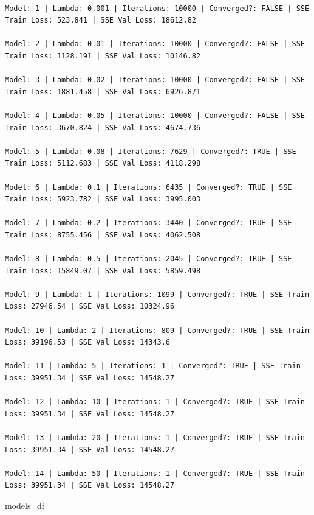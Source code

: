 \documentclass[
  letterpaper,
  DIV=11,
  numbers=noendperiod]{scrartcl}
\newenvironment{Shaded}{\begin{snugshade}}{\end{snugshade}}
\newcommand{\NormalTok}[1]{\textcolor[rgb]{0.00,0.23,0.31}{#1}}
\begin{document}
\begin{verbatim}

Model: 1 | Lambda: 0.001 | Iterations: 10000 | Converged?: FALSE | SSE Train Loss: 523.841 | SSE Val Loss: 18612.82 

Model: 2 | Lambda: 0.01 | Iterations: 10000 | Converged?: FALSE | SSE Train Loss: 1128.191 | SSE Val Loss: 10146.82 

Model: 3 | Lambda: 0.02 | Iterations: 10000 | Converged?: FALSE | SSE Train Loss: 1881.458 | SSE Val Loss: 6926.871 

Model: 4 | Lambda: 0.05 | Iterations: 10000 | Converged?: FALSE | SSE Train Loss: 3670.824 | SSE Val Loss: 4674.736 

Model: 5 | Lambda: 0.08 | Iterations: 7629 | Converged?: TRUE | SSE Train Loss: 5112.683 | SSE Val Loss: 4118.298 

Model: 6 | Lambda: 0.1 | Iterations: 6435 | Converged?: TRUE | SSE Train Loss: 5923.782 | SSE Val Loss: 3995.003 

Model: 7 | Lambda: 0.2 | Iterations: 3440 | Converged?: TRUE | SSE Train Loss: 8755.456 | SSE Val Loss: 4062.508 

Model: 8 | Lambda: 0.5 | Iterations: 2045 | Converged?: TRUE | SSE Train Loss: 15849.07 | SSE Val Loss: 5859.498 

Model: 9 | Lambda: 1 | Iterations: 1099 | Converged?: TRUE | SSE Train Loss: 27946.54 | SSE Val Loss: 10324.96 

Model: 10 | Lambda: 2 | Iterations: 809 | Converged?: TRUE | SSE Train Loss: 39196.53 | SSE Val Loss: 14343.6 

Model: 11 | Lambda: 5 | Iterations: 1 | Converged?: TRUE | SSE Train Loss: 39951.34 | SSE Val Loss: 14548.27 

Model: 12 | Lambda: 10 | Iterations: 1 | Converged?: TRUE | SSE Train Loss: 39951.34 | SSE Val Loss: 14548.27 

Model: 13 | Lambda: 20 | Iterations: 1 | Converged?: TRUE | SSE Train Loss: 39951.34 | SSE Val Loss: 14548.27 

Model: 14 | Lambda: 50 | Iterations: 1 | Converged?: TRUE | SSE Train Loss: 39951.34 | SSE Val Loss: 14548.27 
\end{verbatim}

\begin{Shaded}
\begin{Highlighting}[]
\NormalTok{models\_df}
\end{Highlighting}
\end{Shaded}
\end{document}
